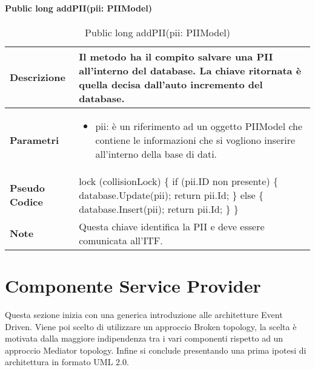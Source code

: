 \paragraph{Public long addPII(pii: PIIModel)}
\begin{center}
    \begin{longtable}{|p{3cm}|p{9cm}|}%
    \caption{Public long addPII(pii: PIIModel)}
    \label{tab:public-long-addPII}
    \endfirsthead
    \endhead
    \hline
    \textbf{Descrizione} & Il metodo ha il compito salvare una PII all’interno del database. La chiave ritornata è quella decisa dall’auto incremento del database. \\
    \hline
    \textbf{Parametri} &      
    \begin{itemize}
        \item pii: è un riferimento ad un oggetto PIIModel che contiene le informazioni che si vogliono inserire all’interno della base di dati.
    \end{itemize}
    \\
    \hline
    \textbf{Pseudo Codice} & 
    lock (collisionLock)\newline
    \{\newline
        if (pii.ID non presente)\newline
        \{\newline
            database.Update(pii);\newline
            return pii.Id;\newline
        \}\newline
        else\newline
        \{\newline
            database.Insert(pii);\newline
            return pii.Id;\newline
        \} \newline
    \}\newline
    \\
    \hline
    \textbf{Note} & 
    Questa chiave identifica la PII e deve essere comunicata all’ITF.
    \\
    \hline
    \end{longtable}
    \end{center}

\newpage
\section{Componente Service Provider}
Questa sezione inizia con una generica introduzione alle architetture Event Driven. Viene poi scelto di utilizzare un approccio Broken topology, la scelta è motivata dalla maggiore indipendenza tra i vari componenti rispetto ad un approccio Mediator topology. Infine si conclude presentando una prima ipotesi di architettura in formato UML 2.0.




